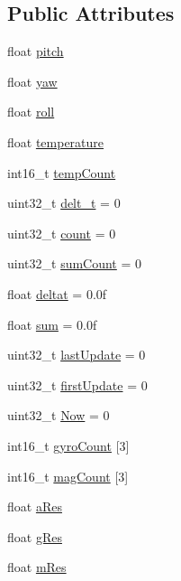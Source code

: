 \subsection*{Public Attributes}
\begin{DoxyCompactItemize}
\item 
float \hyperlink{classMPU9250_ab3d0117a094b81ac2e07f5c2d68aa5f4}{pitch}
\item 
float \hyperlink{classMPU9250_a0493fbbf09cb14b8695a1eb804136e34}{yaw}
\item 
float \hyperlink{classMPU9250_ad394d6659aa446adff547feaa4985f94}{roll}
\item 
float \hyperlink{classMPU9250_a2190394242c2b74ff53c20f8180af287}{temperature}
\item 
int16\+\_\+t \hyperlink{classMPU9250_a8fa1b4fa4bc8db4bd162bc4f8ee8f0ea}{temp\+Count}
\item 
uint32\+\_\+t \hyperlink{classMPU9250_a4d6b6338685120de2e21aa30d9d89389}{delt\+\_\+t} = 0
\item 
uint32\+\_\+t \hyperlink{classMPU9250_a9d231520d019ba7879c60ef7b72707a5}{count} = 0
\item 
uint32\+\_\+t \hyperlink{classMPU9250_a604d036ab632885152ab770b3c64676a}{sum\+Count} = 0
\item 
float \hyperlink{classMPU9250_a1e53d31ab289b64a0d6393b17e8b807e}{deltat} = 0.\+0f
\item 
float \hyperlink{classMPU9250_ac40db4e2fb94e9b33ec0b821c0b6ed2d}{sum} = 0.\+0f
\item 
uint32\+\_\+t \hyperlink{classMPU9250_af60ee039dadb9eb5f4ade404ddfd878b}{last\+Update} = 0
\item 
uint32\+\_\+t \hyperlink{classMPU9250_a4ea2c930abf4529a3888885f9d928cf4}{first\+Update} = 0
\item 
uint32\+\_\+t \hyperlink{classMPU9250_a96b7d70d685ed53744c69acc9f7ef1af}{Now} = 0
\item 
int16\+\_\+t \hyperlink{classMPU9250_a14ab2e2ab741ca245007cb9a134e07f3}{gyro\+Count} \mbox{[}3\mbox{]}
\item 
int16\+\_\+t \hyperlink{classMPU9250_aff92db5334c43a72f5c2f1fc8ee6f596}{mag\+Count} \mbox{[}3\mbox{]}
\item 
float \hyperlink{classMPU9250_afa89af2772cead0f76a4ddd92ec5f6a8}{a\+Res}
\item 
float \hyperlink{classMPU9250_a2c137b20138d3c80c4828691d5656d92}{g\+Res}
\item 
float \hyperlink{classMPU9250_a173e0594b9d3ecb6ece2b71f9f59fc50}{m\+Res}
\item 

\end{DoxyCompactItemize}
